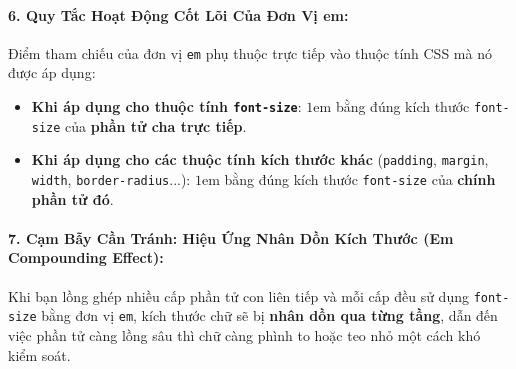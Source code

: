 \documentclass[11pt,oneside]{book}
\newcommand{\thd}[1]{\textcolor{white}{\textbf{\strut #1}}}
\newcommand{\codeinline}[1]{\textcolor{accentOrange}{\texttt{#1}}}
\begin{document}
\paragraph{6. Quy Tắc Hoạt Động Cốt Lõi Của Đơn Vị em:}
Điểm tham chiếu của đơn vị \codeinline{em} phụ thuộc trực tiếp vào thuộc tính CSS mà nó được áp dụng:
\begin{itemize}[leftmargin=1.5em, itemsep=2pt, parsep=0pt]
    \item \textbf{Khi áp dụng cho thuộc tính \codeinline{font-size}}: $1\text{em}$ bằng đúng kích thước \codeinline{font-size} của \textbf{phần tử cha trực tiếp}.
    \item \textbf{Khi áp dụng cho các thuộc tính kích thước khác} (\codeinline{padding}, \codeinline{margin}, \codeinline{width}, \codeinline{border-radius}...): $1\text{em}$ bằng đúng kích thước \codeinline{font-size} của \textbf{chính phần tử đó}.
\end{itemize}

\begin{prettyTableBox}
\sffamily\small
{}
\end{prettyTableBox}

\paragraph{7. Cạm Bẫy Cần Tránh: Hiệu Ứng Nhân Dồn Kích Thước (Em Compounding Effect):}

Khi bạn lồng ghép nhiều cấp phần tử con liên tiếp và mỗi cấp đều sử dụng \codeinline{font-size} bằng đơn vị \codeinline{em}, kích thước chữ sẽ bị \textbf{nhân dồn qua từng tầng}, dẫn đến việc phần tử càng lồng sâu thì chữ càng phình to hoặc teo nhỏ một cách khó kiểm soát.
\end{document}
